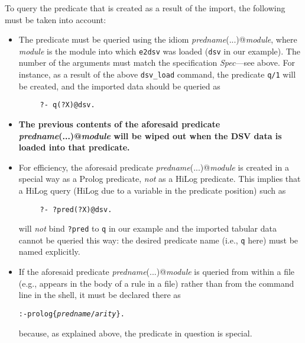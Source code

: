 To query the predicate that is created as a result of the import, the
following must be taken into account:
\begin{itemize}
\item  The predicate must be queried using the idiom
  \emph{predname}(...)@\emph{module}, where \emph{module} is the module
  into which \texttt{e2dsv} was loaded (\texttt{dsv} in our 
  example).
  The number of the arguments must match the specification {\it Spec}---see
  above. For instance, as a result of the above \texttt{dsv\_load} command,
  the predicate \texttt{q/1} will be created, and the imported data
  should be queried as 
\begin{verbatim}
     ?- q(?X)@dsv.  
\end{verbatim}
\item  \textbf{The previous contents of the aforesaid predicate
  \emph{predname}(...)@\emph{module}
  will be wiped out when
  the DSV data is loaded into that predicate.}
\item For efficiency, the aforesaid predicate
  \emph{predname}(...)@\emph{module} is created in a special way as a
  Prolog predicate, \emph{not} as a HiLog predicate.  This implies that a
  HiLog query (HiLog due to a variable in the predicate position) such as
\begin{verbatim}
     ?- ?pred(?X)@dsv.  
\end{verbatim}
  will \emph{not} bind \texttt{?pred} to \texttt{q} in our example
  and the imported tabular data cannot be queried this way: the desired
  predicate name (i.e., \texttt{q} here) must be named explicitly.  
\item  If the aforesaid predicate \emph{predname}(...)@\emph{module}
  is queried from within a file (e.g., appears in the
  body of a rule in a file) rather than from the command line in the \ERGO
  shell, it must be declared there as
\begin{alltt}
    :- prolog\{\textnormal{\emph{predname}}/\textnormal{\emph{arity}}\}.  
\end{alltt}
  because, as explained above, the predicate in question is special.
\end{itemize}


